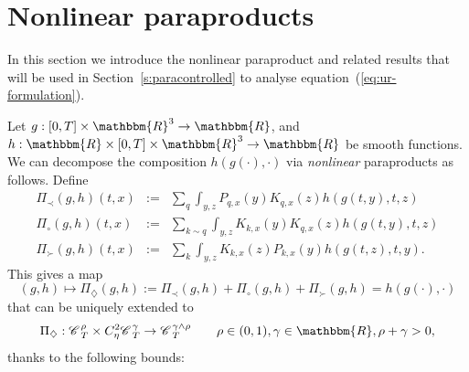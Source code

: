 \documentclass[11pt,reqno]{amsart}
\newcommand{\assign}{:=}
\newcommand{\cdummy}{\cdot}
\newcommand{\nocomma}{}
\newcommand{\tmtextit}[1]{{\itshape{#1}}}
\newcommand{\CC}{\mathscr{C} \hspace{.1em}}
\begin{document}
\section{Nonlinear paraproducts}\label{s:nonlinear}

In this section we introduce the nonlinear paraproduct and related results
that will be used in Section~\ref{s:paracontrolled} to analyse
equation~(\ref{eq:ur-formulation}).

Let $g : [0, T] \times \mathbbm{R}^3 \rightarrow \mathbbm{R}$, and $h :
\mathbbm{R} \times [0, T] \times \mathbbm{R}^3 \rightarrow \mathbbm{R}$ be
smooth functions. We can decompose the composition $h (g (\cdummy), \cdummy)$
via \tmtextit{nonlinear} paraproducts as follows. Define
\begin{eqnarray}
  \Pi_{\prec} (g, h) (t, x) & \assign & \sum_q \int_{y, z} P_{q, x} (y) K_{q,
  x} (z) h (g (t, y), t, z)  \label{e:nonlin-par-small}\\
  \Pi_{\circ} (g, h) (t, x) & \assign & \sum_{k \sim q} \int_{y, z} K_{k, x}
  (y) K_{q, x} (z) h (g (t, y), t, z)  \label{e:nonlin-par-same}\\
  \Pi_{\succ} (g, h) (t, x) & \assign & \sum_k \int_{y, z} K_{k, x} (z) P_{k,
  x} (y) h (g (t, z), t, y) .  \label{e:nonlin-par-big}
\end{eqnarray}
This gives a map
\begin{equation}
  (g, h) \mapsto \Pi_{\nocomma \diamondsuit} (g, h) \assign \Pi_{\prec} (g, h)
  + \Pi_{\circ} (g, h) + \Pi_{\succ} (g, h) = h (g (\cdot), \cdot) 
  \label{e:nonlin-decomp}
\end{equation}
that can be uniquely extended to
\[ \Pi_{\diamondsuit} : \CC_T^{\rho} \times C^2_{\eta} \CC_T^{\gamma}
   \rightarrow \CC_T^{\gamma \wedge \rho} \qquad \rho \in (0, 1), \gamma \in
   \mathbbm{R}, \rho + \gamma > 0, \]
thanks to the following bounds:
\end{document}
